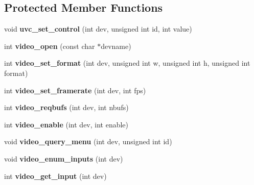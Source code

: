 \subsection*{Protected Member Functions}
\begin{DoxyCompactItemize}
\item 
\hypertarget{classUVCVideo_a52552afe548c906d0586261bce887de9}{void {\bfseries uvc\-\_\-set\-\_\-control} (int dev, unsigned int id, int value)}\label{classUVCVideo_a52552afe548c906d0586261bce887de9}

\item 
\hypertarget{classUVCVideo_a0964e8fc0baa6949c0bbf4b8efd994ff}{int {\bfseries video\-\_\-open} (const char $\ast$devname)}\label{classUVCVideo_a0964e8fc0baa6949c0bbf4b8efd994ff}

\item 
\hypertarget{classUVCVideo_a94997c6af5cc6330bec4d6a2902f39f6}{int {\bfseries video\-\_\-set\-\_\-format} (int dev, unsigned int w, unsigned int h, unsigned int format)}\label{classUVCVideo_a94997c6af5cc6330bec4d6a2902f39f6}

\item 
\hypertarget{classUVCVideo_ad32f1e626a1db3e4f4b6cd164a0512f2}{int {\bfseries video\-\_\-set\-\_\-framerate} (int dev, int fps)}\label{classUVCVideo_ad32f1e626a1db3e4f4b6cd164a0512f2}

\item 
\hypertarget{classUVCVideo_a132d4e99f6018a27111e09d84238931c}{int {\bfseries video\-\_\-reqbufs} (int dev, int nbufs)}\label{classUVCVideo_a132d4e99f6018a27111e09d84238931c}

\item 
\hypertarget{classUVCVideo_ab68ed6053c4d9b1d1e69bfc4fb361bd0}{int {\bfseries video\-\_\-enable} (int dev, int enable)}\label{classUVCVideo_ab68ed6053c4d9b1d1e69bfc4fb361bd0}

\item 
\hypertarget{classUVCVideo_a13a17978d4b51363f6afbcbe2c554b0f}{void {\bfseries video\-\_\-query\-\_\-menu} (int dev, unsigned int id)}\label{classUVCVideo_a13a17978d4b51363f6afbcbe2c554b0f}

\item 
\hypertarget{classUVCVideo_a155aef393c73a2db06b773aea2dbf21e}{void {\bfseries video\-\_\-enum\-\_\-inputs} (int dev)}\label{classUVCVideo_a155aef393c73a2db06b773aea2dbf21e}

\item 
\hypertarget{classUVCVideo_a2c5d1ee9051d61b1c03b0b40f36c972c}{int {\bfseries video\-\_\-get\-\_\-input} (int dev)}\label{classUVCVideo_a2c5d1ee9051d61b1c03b0b40f36c972c}


\end{DoxyCompactItemize}

